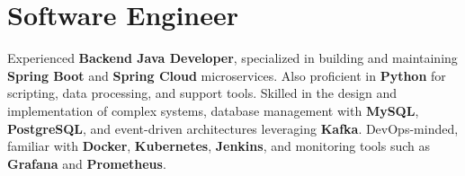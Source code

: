 \section{Software Engineer}
\small{
  Experienced \textbf{Backend Java Developer}, 
  specialized in building and maintaining \textbf{Spring Boot} and \textbf{Spring Cloud} microservices. Also proficient in \textbf{Python} for scripting, 
  data processing, and support tools. 
  Skilled in the design and implementation of complex systems, database management with \textbf{MySQL}, \textbf{PostgreSQL}, and event-driven architectures leveraging \textbf{Kafka}. 
  DevOps-minded, familiar with \textbf{Docker}, \textbf{Kubernetes}, \textbf{Jenkins}, and monitoring tools such as \textbf{Grafana} and \textbf{Prometheus}.
}